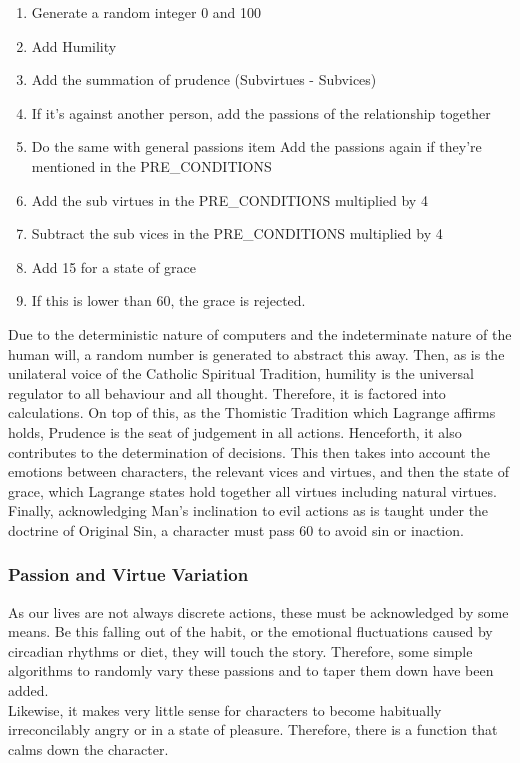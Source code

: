 \documentclass[11pt]{article}
\begin{document}
\begin{enumerate}
	\item Generate a random integer 0 and 100
	\item Add Humility 
	\item Add the summation of prudence (Subvirtues - Subvices) 
	\item If it's against another person, add the passions of the relationship together
	\item Do the same with general passions
	item Add the passions again if they're mentioned in the PRE\_CONDITIONS
	\item Add the sub virtues in the PRE\_CONDITIONS multiplied by 4
	\item Subtract the sub vices in the PRE\_CONDITIONS multiplied by 4
	\item Add 15 for a state of grace
	\item If this is lower than 60, the grace is rejected.
\end{enumerate}

Due to the deterministic nature of computers and the indeterminate nature of the human will, a random number is generated to abstract this away. Then, as is the unilateral voice of the Catholic Spiritual Tradition, humility is the universal regulator to all behaviour and all thought. Therefore, it is factored into calculations. On top of this, as the Thomistic Tradition which Lagrange affirms holds, Prudence is the seat of judgement in all actions. Henceforth, it also contributes to the determination of decisions. This then takes into account the emotions between characters, the relevant vices and virtues, and then the state of grace, which Lagrange states hold together all virtues including natural virtues. Finally, acknowledging Man's inclination to evil actions as is taught under the doctrine of Original Sin, a character must pass 60 to avoid sin or inaction. \\
\subsubsection{Passion and Virtue Variation} 
As our lives are not always discrete actions, these must be acknowledged by some means. Be this falling out of the habit, or the emotional fluctuations caused by circadian rhythms or diet, they will touch the story. Therefore, some simple algorithms to randomly vary these passions and to taper them down have been added.\\

Likewise, it makes very little sense for characters to become habitually irreconcilably angry or in a state of pleasure. Therefore, there is a function that calms down the character. \\
\end{document}
